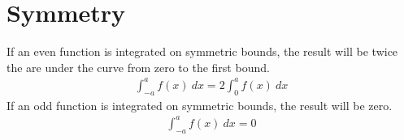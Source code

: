 \documentclass{article}
\theoremstyle{mytheoremstyle}
\theoremstyle{mytheoremstyle}
\theoremstyle{myproblemstyle}
\begin{document}
    \section*{Symmetry}
    If an even function is integrated on symmetric bounds, the result will be
    twice the are under the curve from zero to the first bound.
    \begin{align*}
        \int_{-a}^{a} f(x) \ dx = 2 \int_{0}^{a} f(x) \ dx
    \end{align*}
    If an odd function is integrated on symmetric bounds, the result will be
    zero.
    \begin{align*}
        \int_{-a}^{a} f(x) \ dx = 0
    \end{align*}
\end{document}
